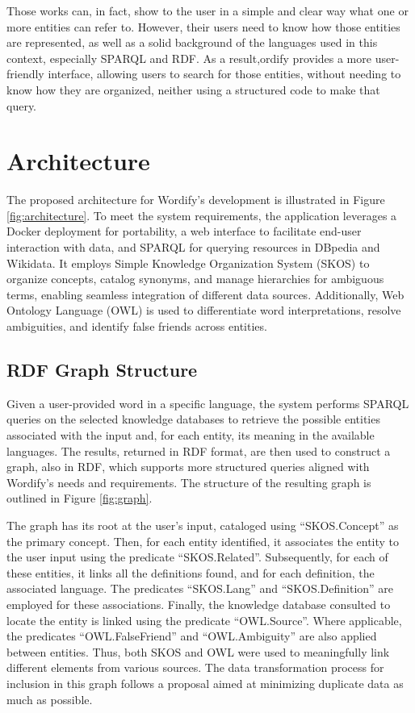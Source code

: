 \documentclass[twocolumn,twoside,11pt,a4paper]{article}
\begin{document}
Those works can, in fact, show to the user in a simple and clear way what one or more entities can refer to. However, their users need to know how those entities are represented, as well as a solid background of the languages used in this context, especially SPARQL and RDF. As a result,ordify provides a more user-friendly interface, allowing users to search for those entities, without needing to know how they are organized, neither using a structured code to make that query.


\section{Architecture}\label{sec:application}

The proposed architecture for Wordify's development is illustrated in Figure \ref{fig:architecture}. To meet the system requirements, the application leverages a Docker \cite{docker} deployment for portability, a web interface to facilitate end-user interaction with data, and SPARQL for querying resources in DBpedia and Wikidata. It employs Simple Knowledge Organization System (SKOS) \cite{skos} to organize concepts, catalog synonyms, and manage hierarchies for ambiguous terms, enabling seamless integration of different data sources. Additionally, Web Ontology Language (OWL) \cite{owl} is used to differentiate word interpretations, resolve ambiguities, and identify false friends across entities.

\subsection{RDF Graph Structure}

Given a user-provided word in a specific language, the system performs SPARQL queries on the selected knowledge databases to retrieve the possible entities associated with the input and, for each entity, its meaning in the available languages. The results, returned in RDF format, are then used to construct a graph, also in RDF, which supports more structured queries aligned with Wordify's needs and requirements. The structure of the resulting graph is outlined in Figure \ref{fig:graph}.

The graph has its root at the user's input, cataloged using ``SKOS.Concept'' as the primary concept. Then, for each entity identified, it associates the entity to the user input using the predicate ``SKOS.Related''. Subsequently, for each of these entities, it links all the definitions found, and for each definition, the associated language. The predicates ``SKOS.Lang'' and ``SKOS.Definition'' are employed for these associations. Finally, the knowledge database consulted to locate the entity is linked using the predicate ``OWL.Source''. Where applicable, the predicates ``OWL.FalseFriend'' and ``OWL.Ambiguity'' are also applied between entities. Thus, both SKOS and OWL were used to meaningfully link different elements from various sources. The data transformation process for inclusion in this graph follows a proposal aimed at minimizing duplicate data as much as possible.
\end{document}
